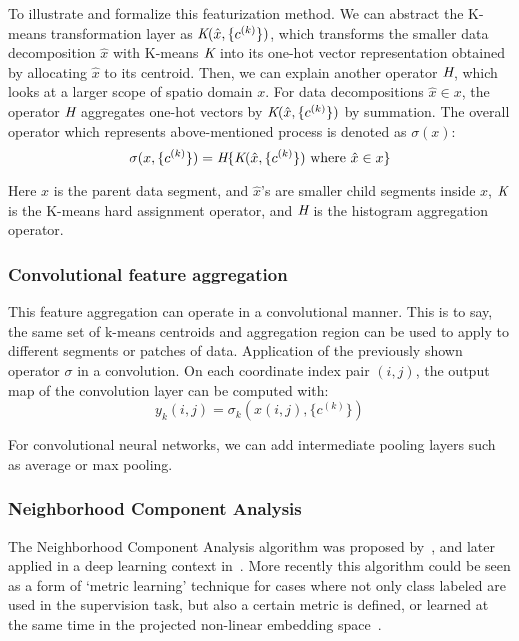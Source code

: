 \documentclass{article}
\begin{document}
To illustrate and formalize this featurization method. We can abstract the K-means transformation layer as  $\emph{K}(\hat{x}, \{c^{(k)}\})$, which transforms the smaller data decomposition $\hat{x}$ with K-means $\emph{K}$ into its one-hot vector representation obtained by allocating $\hat{x}$ to its centroid. Then, we can explain another operator $\emph{H}$, which looks at a larger scope of spatio domain $x$. For data decompositions $\hat{x} \in x$, the operator $\emph{H}$ aggregates one-hot vectors by $\emph{K}(\hat{x}, \{c^{(k)}\})$ by summation. The overall operator which represents above-mentioned process is denoted as $\sigma(x)$: 
\begin{equation} 
\sigma(x, \{c^{(k)}\}) = \emph{H} \{ \emph{K} (\hat{x}, \{c^{(k)}\}) \text{ where } \hat{x} \in x \}  
\end{equation} 

Here $x$ is the parent data segment, and $\hat{x}$'s are smaller child segments inside $x$, $\emph{K}$ is the K-means hard assignment operator, and $\emph{H}$ is the histogram aggregation operator. 

\subsubsection{Convolutional feature aggregation} 
This feature aggregation can operate in a convolutional manner. This is to say, the same set of k-means centroids and aggregation region 
can be used to apply to different segments or patches of data. Application of the previously shown operator $\sigma$ in a convolution. On each coordinate index pair $(i, j)$, the output map of the convolution layer can be computed with: 
\begin{equation} 
y_k(i, j) = \sigma_k(x(i, j), \{c^{(k)}\}) 
\end{equation} 

For convolutional neural networks, we can add intermediate pooling layers such as average or max pooling. 


\subsubsection{Neighborhood Component Analysis} 
The Neighborhood Component Analysis algorithm was proposed 
by~\cite{roweis17neighborhood}, and later applied in a deep learning 
context in~\cite{salakhutdinov2007learning}. More recently this 
algorithm could be seen as a form of `metric learning' technique for 
cases where not only class labeled are used in the supervision task, 
but also a certain metric is defined, or learned at the same time in 
the projected non-linear embedding space~\cite{kedem2012non}. 
\end{document}
